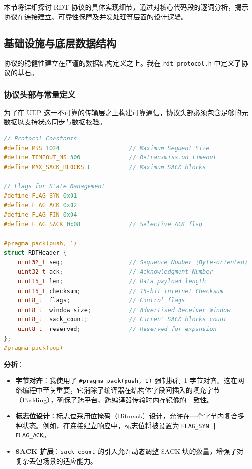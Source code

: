 \documentclass[UTF8,a4paper,10pt]{ctexart}
\begin{document}
本节将详细探讨 RDT 协议的具体实现细节，通过对核心代码段的逐词分析，揭示协议在连接建立、可靠性保障及并发处理等层面的设计逻辑。

\subsection{基础设施与底层数据结构}

协议的稳健性建立在严谨的数据结构定义之上。我在 \texttt{rdt\_protocol.h} 中定义了协议的基石。

\subsubsection{协议头部与常量定义}
为了在 UDP 这一不可靠的传输层之上构建可靠通信，协议头部必须包含足够的元数据以支持状态同步与数据校验。

\begin{lstlisting}[language=C++]
// Protocol Constants
#define MSS 1024                    // Maximum Segment Size
#define TIMEOUT_MS 300              // Retransmission timeout
#define MAX_SACK_BLOCKS 8           // Maximum SACK blocks

// Flags for State Management
#define FLAG_SYN 0x01
#define FLAG_ACK 0x02
#define FLAG_FIN 0x04
#define FLAG_SACK 0x08              // Selective ACK flag

#pragma pack(push, 1)
struct RDTHeader {
    uint32_t seq;                   // Sequence Number (Byte-oriented)
    uint32_t ack;                   // Acknowledgment Number
    uint16_t len;                   // Data payload length
    uint16_t checksum;              // 16-bit Internet Checksum
    uint8_t  flags;                 // Control flags
    uint8_t  window_size;           // Advertised Receiver Window
    uint8_t  sack_count;            // Current SACK blocks count
    uint8_t  reserved;              // Reserved for expansion
};
#pragma pack(pop)
\end{lstlisting}

\textbf{分析}：
\begin{itemize}
    \item \textbf{字节对齐}：我使用了 \texttt{\#pragma pack(push, 1)} 强制执行 1 字节对齐。这在网络编程中至关重要，它消除了编译器在结构体字段间插入的填充字节（Padding），确保了跨平台、跨编译器传输时内存镜像的一致性。
    \item \textbf{标志位设计}：标志位采用位掩码（Bitmask）设计，允许在一个字节内复合多种状态。例如，在连接建立响应中，标志位将被设置为 \texttt{FLAG\_SYN | FLAG\_ACK}。
    \item \textbf{SACK 扩展}：\texttt{sack\_count} 的引入允许动态调整 SACK 块的数量，增强了对复杂丢包场景的适应能力。
\end{itemize}
\end{document}
